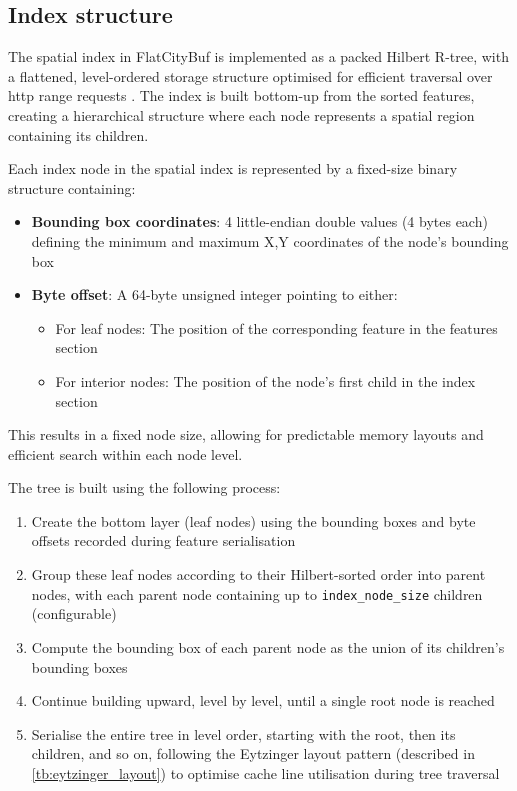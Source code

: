 \subsection{Index structure}
\label{methodology:spatial_index:index_structure}

The spatial index in FlatCityBuf is implemented as a packed Hilbert R-tree, with a flattened, level-ordered storage structure optimised for efficient traversal over \ac{http} range requests \citep{horance_2022_detail}. The index is built bottom-up from the sorted features, creating a hierarchical structure where each node represents a spatial region containing its children.

Each index node in the spatial index is represented by a fixed-size binary structure containing:

\begin{itemize}
  \item \textbf{Bounding box coordinates}: 4 little-endian double values (4 bytes each) defining the minimum and maximum X,Y coordinates of the node's bounding box
  \item \textbf{Byte offset}: A 64-byte unsigned integer pointing to either:
    \begin{itemize}
      \item For leaf nodes: The position of the corresponding feature in the features section
      \item For interior nodes: The position of the node's first child in the index section
    \end{itemize}
\end{itemize}

This results in a fixed node size, allowing for predictable memory layouts and efficient search within each node level.

The tree is built using the following process:

\begin{enumerate}
  \item Create the bottom layer (leaf nodes) using the bounding boxes and byte offsets recorded during feature serialisation
  \item Group these leaf nodes according to their Hilbert-sorted order into parent nodes, with each parent node containing up to \texttt{index\_node\_size} children (configurable)
  \item Compute the bounding box of each parent node as the union of its children's bounding boxes
  \item Continue building upward, level by level, until a single root node is reached
  \item Serialise the entire tree in level order, starting with the root, then its children, and so on, following the Eytzinger layout pattern (described in \autoref{tb:eytzinger_layout}) to optimise cache line utilisation during tree traversal
\end{enumerate}

